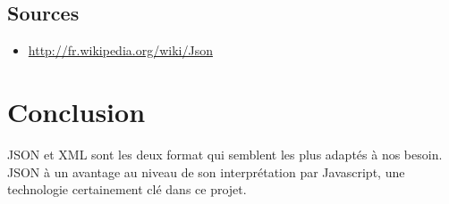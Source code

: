 \documentclass[a4paper,10pt]{report}
\begin{document}
    \subsection{Sources}

\begin{itemize}
 \item \url{http://fr.wikipedia.org/wiki/Json}
\end{itemize}

  \section{Conclusion}

JSON et XML sont les deux format qui semblent les plus adaptés à nos besoin. 
JSON à un avantage au niveau de son interprétation par Javascript, une 
technologie certainement clé dans ce projet.
\end{document}
